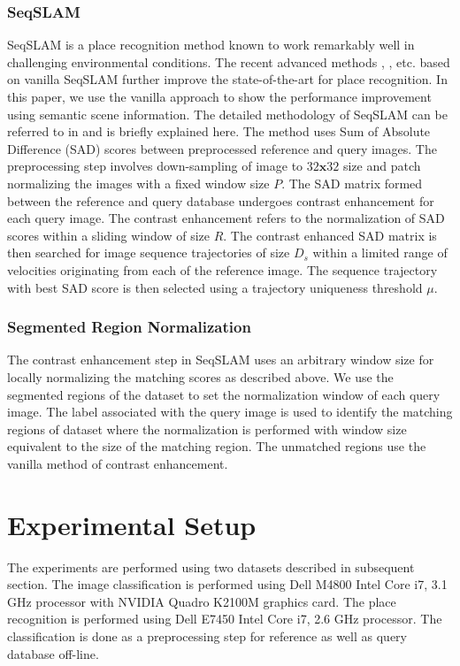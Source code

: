 \documentclass[twocolumn]{article}
\begin{document}
\subsubsection{SeqSLAM}
SeqSLAM \cite{Milford2012} is a place recognition method known to work remarkably well in challenging environmental conditions. The recent advanced methods \cite{milford2015sequence}, \cite{wang2015improved}, \cite{milford2015place} etc. based on vanilla SeqSLAM further improve the state-of-the-art for place recognition. In this paper, we use the vanilla approach to show the performance improvement using semantic scene information. The detailed methodology of SeqSLAM can be referred to in \cite{Milford2012} and is briefly explained here. The method uses Sum of Absolute Difference (SAD) scores between preprocessed reference and query images. The preprocessing step involves down-sampling of image to $32\mathbf{x}32$ size and patch normalizing the images with a fixed window size $P$. The SAD matrix formed between the reference and query database undergoes contrast enhancement for each query image. The contrast enhancement refers to the normalization of SAD scores within a sliding window of size $R$. The contrast enhanced SAD matrix is then searched for image sequence trajectories of size $D_s$ within a limited range of velocities originating from each of the reference image. The sequence trajectory with best SAD score is then selected using a trajectory uniqueness threshold $\mu$.

\subsubsection{Segmented Region Normalization}
The contrast enhancement step in SeqSLAM uses an arbitrary window size for locally normalizing the matching scores as described above. We use the segmented regions of the dataset to set the normalization window of each query image. The label associated with the query image is used to identify the matching regions of dataset where the normalization is performed with window size equivalent to the size of the matching region. The unmatched regions use the vanilla method of contrast enhancement.

\section{Experimental Setup}
The experiments are performed using two datasets described in subsequent section. The image classification is performed using Dell M4800 Intel Core i7, 3.1 GHz processor with NVIDIA Quadro K2100M graphics card. The place recognition is performed using Dell E7450 Intel Core i7, 2.6 GHz processor. The classification is done as a preprocessing step for reference as well as query database off-line.
\end{document}
